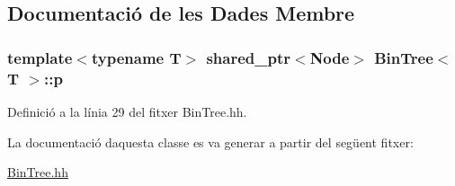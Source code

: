 \subsection{Documentació de les Dades Membre}
\subsubsection[{\texorpdfstring{p}{p}}]{\setlength{\rightskip}{0pt plus 5cm}template$<$typename T$>$ shared\+\_\+ptr$<${\bf Node}$>$ {\bf Bin\+Tree}$<$ T $>$\+::p\hspace{0.3cm}{\ttfamily [private]}}\hypertarget{class_bin_tree_afe3647af1dda90f6ddf1deee6560fcf1}{}\label{class_bin_tree_afe3647af1dda90f6ddf1deee6560fcf1}


Definició a la línia 29 del fitxer Bin\+Tree.\+hh.



La documentació d\textquotesingle{}aquesta classe es va generar a partir del següent fitxer\+:\begin{DoxyCompactItemize}
\item 
\hyperlink{_bin_tree_8hh}{Bin\+Tree.\+hh}\end{DoxyCompactItemize}
